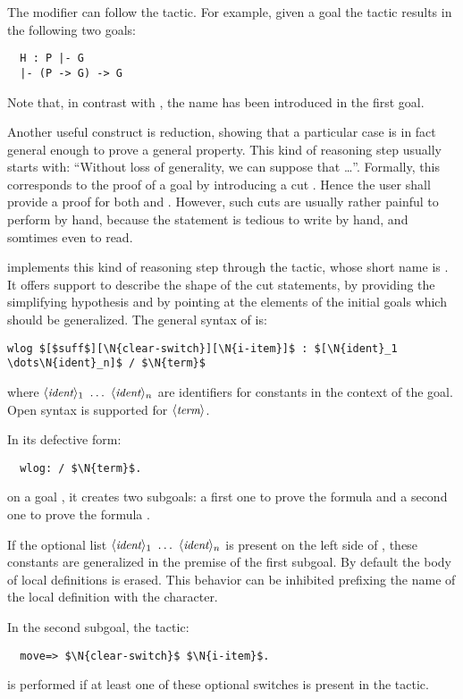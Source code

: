 The  modifier can follow the  tactic.
For example, given a goal  the tactic
 results in the following two goals:
\begin{lstlisting}
  H : P |- G
  |- (P -> G) -> G
\end{lstlisting}
Note that, in contrast with , the name  has been introduced
in the first goal.

Another useful construct is reduction,
showing that a particular case is in fact general enough to prove
a general property. This kind of reasoning step usually starts with:
``Without loss of generality, we can suppose that \dots''.
Formally, this corresponds to the proof of a goal  by introducing
a cut . Hence the user shall provide a
proof for both  and
. However, such cuts are usually rather
painful to perform by hand, because the statement
 is tedious to write by hand, and somtimes even
to read.

\ssr{} implements this kind of reasoning step through the 
tactic, whose short name is . It offers support to describe
the shape of the cut statements, by providing the simplifying
hypothesis and by pointing at the elements of the initial goals which
should be generalized. The general syntax of  is:
\begin{lstlisting}
wlog $[$suff$][\N{clear-switch}][\N{i-item}]$ : $[\N{ident}_1 \dots\N{ident}_n]$ / $\N{term}$
\end{lstlisting}
where $\N{ident}_1\ \dots\ \N{ident}_n$ are identifiers for constants
in the context of the goal. Open syntax is supported for $\langle\mbox{\itshape\rmfamily\small term}\rangle$.

In its defective form:
\begin{lstlisting}
  wlog: / $\N{term}$.
\end{lstlisting}
on a goal , it creates two subgoals: a first one to prove the formula
 and a second one to prove the formula
.

If the optional list $\N{ident}_1\ \dots\ \N{ident}_n$ is present on the left
side of \C{/}, these constants are generalized in the premise
 of the first subgoal. By default the body of
local definitions  is erased. This behavior can be inhibited
prefixing the name of the local definition with the  character.

In the second subgoal, the tactic:
\begin{lstlisting}
  move=> $\N{clear-switch}$ $\N{i-item}$.
\end{lstlisting}
is performed if at least one of these optional switches is present in
the  tactic.

